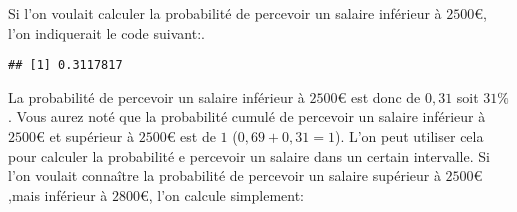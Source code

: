 \documentclass[
]{book}
\newenvironment{Shaded}{\begin{snugshade}}{\end{snugshade}}
\newcommand{\AttributeTok}[1]{\textcolor[rgb]{0.77,0.63,0.00}{#1}}
\newcommand{\CommentTok}[1]{\textcolor[rgb]{0.56,0.35,0.01}{\textit{#1}}}
\newcommand{\DecValTok}[1]{\textcolor[rgb]{0.00,0.00,0.81}{#1}}
\newcommand{\FunctionTok}[1]{\textcolor[rgb]{0.00,0.00,0.00}{#1}}
\newcommand{\NormalTok}[1]{#1}
\newcommand{\SpecialCharTok}[1]{\textcolor[rgb]{0.00,0.00,0.00}{#1}}
\begin{document}
Si l'on voulait calculer la probabilité de percevoir un salaire inférieur à \(2500€\), l'on indiquerait le code suivant:.

\begin{Shaded}
\end{Shaded}

\begin{verbatim}
## [1] 0.3117817
\end{verbatim}

La probabilité de percevoir un salaire inférieur à \(2500€\) est donc de \(0,31\) soit \(31\%\). Vous aurez noté que la probabilité cumulé de percevoir un salaire inférieur à \(2500€\) et supérieur à \(2500€\) est de \(1\) (\(0,69+0,31=1\)). L'on peut utiliser cela pour calculer la probabilité e percevoir un salaire dans un certain intervalle. Si l'on voulait connaître la probabilité de percevoir un salaire supérieur à \(2500€\),mais inférieur à \(2800€\), l'on calcule simplement:
\end{document}

